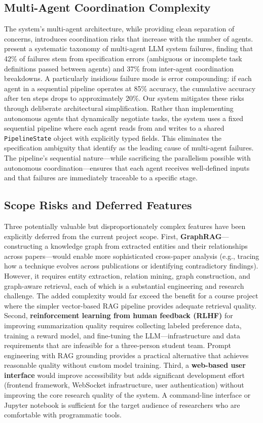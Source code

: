\documentclass[12pt,a4paper]{article}
\begin{document}
\subsection{Multi-Agent Coordination Complexity}

The system's multi-agent architecture, while providing clean separation of concerns, introduces coordination risks that increase with the number of agents. \citet{cemri2025mast} present a systematic taxonomy of multi-agent LLM system failures, finding that 42\% of failures stem from specification errors (ambiguous or incomplete task definitions passed between agents) and 37\% from inter-agent coordination breakdowns. A particularly insidious failure mode is error compounding: if each agent in a sequential pipeline operates at 85\% accuracy, the cumulative accuracy after ten steps drops to approximately 20\%. Our system mitigates these risks through deliberate architectural simplification. Rather than implementing autonomous agents that dynamically negotiate tasks, the system uses a fixed sequential pipeline where each agent reads from and writes to a shared \texttt{PipelineState} object with explicitly typed fields. This eliminates the specification ambiguity that \citet{cemri2025mast} identify as the leading cause of multi-agent failures. The pipeline's sequential nature---while sacrificing the parallelism possible with autonomous coordination---ensures that each agent receives well-defined inputs and that failures are immediately traceable to a specific stage.

\subsection{Scope Risks and Deferred Features}

Three potentially valuable but disproportionately complex features have been explicitly deferred from the current project scope. First, \textbf{GraphRAG}---constructing a knowledge graph from extracted entities and their relationships across papers---would enable more sophisticated cross-paper analysis (e.g., tracing how a technique evolves across publications or identifying contradictory findings). However, it requires entity extraction, relation mining, graph construction, and graph-aware retrieval, each of which is a substantial engineering and research challenge. The added complexity would far exceed the benefit for a course project where the simpler vector-based RAG pipeline provides adequate retrieval quality. Second, \textbf{reinforcement learning from human feedback (RLHF)} for improving summarization quality requires collecting labeled preference data, training a reward model, and fine-tuning the LLM---infrastructure and data requirements that are infeasible for a three-person student team. Prompt engineering with RAG grounding provides a practical alternative that achieves reasonable quality without custom model training. Third, a \textbf{web-based user interface} would improve accessibility but adds significant development effort (frontend framework, WebSocket infrastructure, user authentication) without improving the core research quality of the system. A command-line interface or Jupyter notebook is sufficient for the target audience of researchers who are comfortable with programmatic tools.
\end{document}
